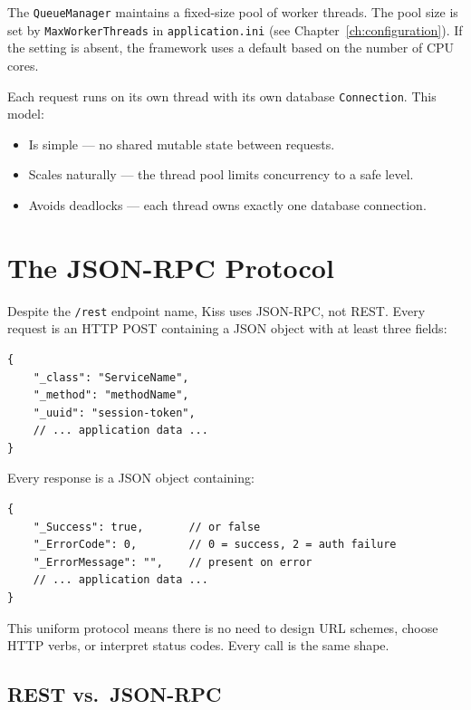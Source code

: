 The \texttt{QueueManager} maintains a fixed-size pool of worker threads.  The pool size is set by \texttt{MaxWorkerThreads} in \texttt{application.ini} (see Chapter~\ref{ch:configuration}).  If the setting is absent, the framework uses a default based on the number of CPU cores.

Each request runs on its own thread with its own database \texttt{Connection}.  This model:

\begin{itemize}
  \item Is simple --- no shared mutable state between requests.
  \item Scales naturally --- the thread pool limits concurrency to a safe level.
  \item Avoids deadlocks --- each thread owns exactly one database connection.
\end{itemize}

\section{The JSON-RPC Protocol}
\label{sec:arch-jsonrpc}

Despite the \texttt{/rest} endpoint name, Kiss uses JSON-RPC, not REST.  Every request is an HTTP POST containing a JSON object with at least three fields:

\begin{lstlisting}[style=javascript]
{
    "_class": "ServiceName",
    "_method": "methodName",
    "_uuid": "session-token",
    // ... application data ...
}
\end{lstlisting}

\noindent
Every response is a JSON object containing:

\begin{lstlisting}[style=javascript]
{
    "_Success": true,       // or false
    "_ErrorCode": 0,        // 0 = success, 2 = auth failure
    "_ErrorMessage": "",    // present on error
    // ... application data ...
}
\end{lstlisting}

\noindent
This uniform protocol means there is no need to design URL schemes, choose HTTP verbs, or interpret status codes.  Every call is the same shape.

\subsection{REST vs.\ JSON-RPC}
\label{sec:arch-rest-vs-rpc}

